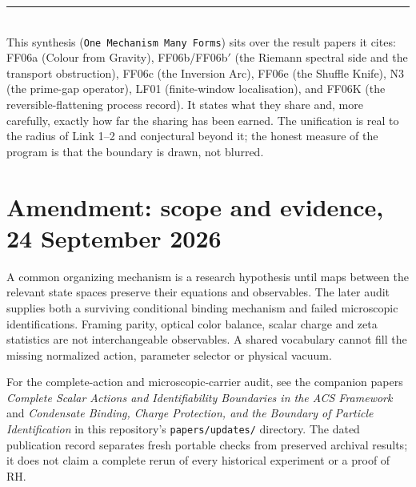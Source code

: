 \documentclass[11pt,a4paper]{article}
\newcommand{\paper}[1]{\textsf{#1}}
\theoremstyle{definition}
\theoremstyle{plain}
\begin{document}
\vspace{1em}
\noindent\rule{\linewidth}{0.4pt}\\
\small This synthesis (\texttt{One Mechanism Many Forms}) sits over the result papers it cites:
\paper{FF06a} (Colour from Gravity), \paper{FF06b}/\paper{FF06b$'$} (the Riemann spectral side and the
transport obstruction), \paper{FF06c} (the Inversion Arc), \paper{FF06e} (the Shuffle Knife),
\paper{N3} (the prime-gap operator), \paper{LF01} (finite-window localisation), and \paper{FF06K} (the
reversible-flattening process record). It states what they share and, more carefully, exactly how far
the sharing has been earned. The unification is real to the radius of Link 1--2 and conjectural beyond
it; the honest measure of the program is that the boundary is drawn, not blurred.


\section*{Amendment: scope and evidence, 24 September 2026}
A common organizing mechanism is a research hypothesis until maps between the relevant state spaces preserve their equations and observables. The later audit supplies both a surviving conditional binding mechanism and failed microscopic identifications. Framing parity, optical color balance, scalar charge and zeta statistics are not interchangeable observables. A shared vocabulary cannot fill the missing normalized action, parameter selector or physical vacuum.

For the complete-action and microscopic-carrier audit, see the companion
papers \emph{Complete Scalar Actions and Identifiability Boundaries in the ACS
Framework} and \emph{Condensate Binding, Charge Protection, and the Boundary
of Particle Identification} in this repository's \texttt{papers/updates/}
directory. The dated publication record separates fresh portable checks
from preserved archival results; it does not claim a complete rerun of every
historical experiment or a proof of RH.
\end{document}
